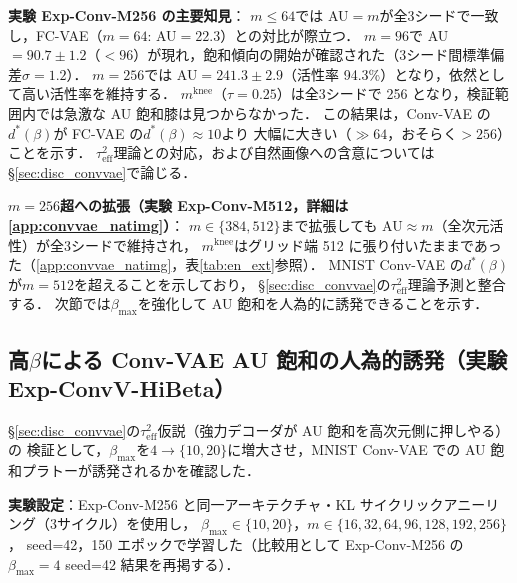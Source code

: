 \documentclass[11pt,a4paper]{jsarticle}
\newcommand{\mknee}{m^{\mathrm{knee}}}
\begin{document}
\textbf{実験 Exp-Conv-M256 の主要知見}：
$m \leq 64$では AU$=m$が全3シードで一致し，FC-VAE（$m=64$: AU$=22.3$）との対比が際立つ．
$m = 96$で AU$=90.7\pm1.2$（$<96$）が現れ，飽和傾向の開始が確認された（3シード間標準偏差$\sigma=1.2$）．
$m=256$では AU$=241.3\pm2.9$（活性率 94.3\%）となり，依然として高い活性率を維持する．
$\mknee$（$\tau=0.25$）は全3シードで 256 となり，検証範囲内では急激な AU 飽和膝は見つからなかった．
この結果は，Conv-VAE の$d^*(\beta)$が FC-VAE の$d^*(\beta) \approx 10$より
大幅に大きい（$\gg 64$，おそらく$> 256$）ことを示す．
$\tau^2_\mathrm{eff}$理論との対応，および自然画像への含意については §\ref{sec:disc_convvae}で論じる．

\textbf{$m=256$超への拡張（実験 Exp-Conv-M512，詳細は\ref{app:convvae_natimg}）}：
$m \in \{384, 512\}$まで拡張しても AU$\approx m$（全次元活性）が全3シードで維持され，
$\mknee$はグリッド端 512 に張り付いたままであった（\ref{app:convvae_natimg}，表\ref{tab:en_ext}参照）．
MNIST Conv-VAE の$d^*(\beta)$が$m=512$を超えることを示しており，
§\ref{sec:disc_convvae}の$\tau^2_\mathrm{eff}$理論予測と整合する．
次節では$\beta_{\max}$を強化して AU 飽和を人為的に誘発できることを示す．

\subsection{高$\beta$による Conv-VAE AU 飽和の人為的誘発（実験 Exp-ConvV-HiBeta）}\label{sec:exp_hibeta}

§\ref{sec:disc_convvae}の$\tau^2_\mathrm{eff}$仮説（強力デコーダが AU 飽和を高次元側に押しやる）の
検証として，$\beta_{\max}$を$4 \to \{10, 20\}$に増大させ，MNIST Conv-VAE での
AU 飽和プラトーが誘発されるかを確認した．

\textbf{実験設定}：Exp-Conv-M256 と同一アーキテクチャ・KL サイクリックアニーリング（3サイクル）を使用し，
$\beta_{\max} \in \{10, 20\}$，$m \in \{16, 32, 64, 96, 128, 192, 256\}$，
seed=42，150 エポックで学習した（比較用として Exp-Conv-M256 の$\beta_{\max}=4$ seed=42 結果を再掲する）．
\end{document}
